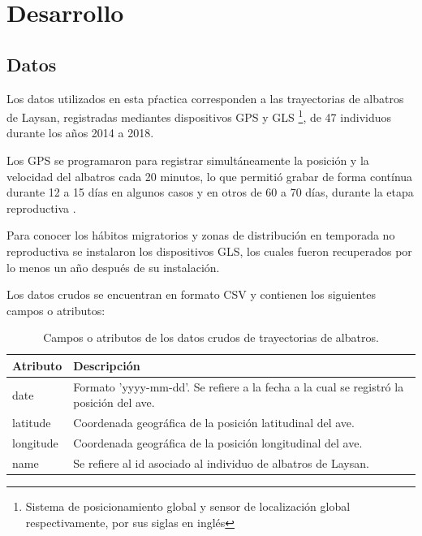 
\section{Desarrollo}



\subsection{Datos}

Los datos utilizados en esta pŕactica corresponden a las trayectorias de
albatros de Laysan, registradas mediantes dispositivos GPS y GLS
\footnote{Sistema de posicionamiento global y sensor de localización global
respectivamente, por sus siglas en inglés}, de 47 individuos durante los años
2014 a 2018.

Los GPS se programaron para registrar simultáneamente la posición y la velocidad
del albatros cada 20 minutos, lo que permitió grabar de forma contínua durante
12 a 15 días en algunos casos y en otros de 60 a 70 días, durante la etapa
reproductiva \cite{hernandez2019ecologia}.

Para conocer los hábitos migratorios y zonas de distribución en temporada no
reproductiva se instalaron los dispositivos GLS, los cuales fueron recuperados
por lo menos un año después de su instalación.

Los datos crudos se encuentran en formato CSV y contienen los siguientes campos
o atributos:

\begin{table}[h]
\caption{Campos o atributos de los datos crudos de trayectorias de albatros.}
\begin{center}
    \begin{tabular}{ l  m{7cm} }
        \hline
        Atributo & Descripción \\
        \hline
        date & Formato 'yyyy-mm-dd'. Se refiere a la fecha a la cual se registró
        la posición del ave. \\
        \hline
        latitude & Coordenada geográfica de la posición latitudinal del ave. \\
        \hline
        longitude & Coordenada geográfica de la posición longitudinal del ave.
        \\
        \hline
        name & Se refiere al id asociado al individuo de albatros de Laysan.\\
        \hline
    \end{tabular}
\end{center}
\end{table}


